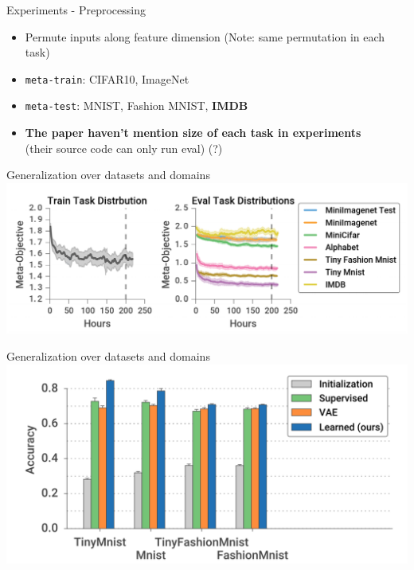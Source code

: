 \documentclass{beamer}
\begin{document}
\begin{frame}{Experiments - Preprocessing}
  \begin{itemize}
    \item Permute inputs along feature dimension (Note: same permutation in each task)
    \item \texttt{meta-train}: CIFAR10, ImageNet
    \item \texttt{meta-test}: MNIST, Fashion MNIST, \textbf{IMDB}
  \item \textbf{The paper haven't mention size of each task in experiments} \\
    (their source code can only run eval) (?)
  \end{itemize}
\end{frame}

\begin{frame}{Generalization over datasets and domains}
  \center \includegraphics[width=\textwidth]{fig/lc.png}
\end{frame}

\begin{frame}{Generalization over datasets and domains}
  \center \includegraphics[width=\textwidth]{fig/mnist.png}
\end{frame}
\end{document}
